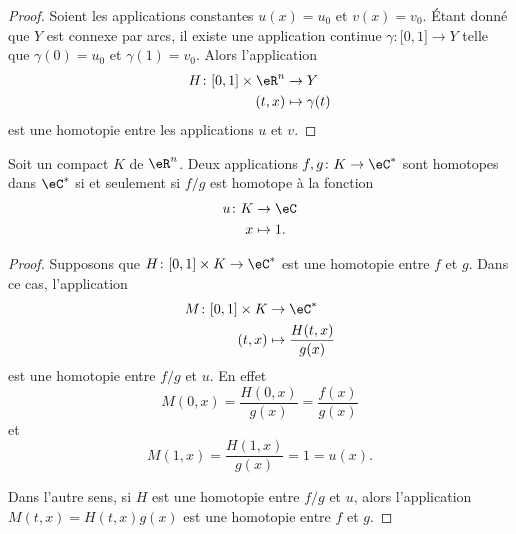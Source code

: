 \begin{proof}
    Soient les applications constantes \( u(x)=u_0\) et \( v(x)=v_0\). Étant donné que \( Y\) est connexe par arcs, il existe une application continue \( \gamma\colon \mathopen[ 0 , 1 \mathclose]\to Y\) telle que \( \gamma(0)=u_0\) et \( \gamma(1)=v_0\). Alors l'application
    \begin{equation}
        \begin{aligned}
            H\colon \mathopen[ 0 , 1 \mathclose]\times \eR^n&\to Y \\
            (t,x)&\mapsto \gamma(t) 
        \end{aligned}
    \end{equation}
    est une homotopie entre les applications \( u\) et \( v\).
\end{proof}

\begin{proposition}       \label{PROPooNABDooFtKukO}
    Soit un compact \( K\) de \( \eR^n\). Deux applications \( f,g\colon K\to \eC^*\) sont homotopes dans \( \eC^*\) si et seulement si \( f/g\) est homotope à la fonction 
    \begin{equation}
        \begin{aligned}
            u\colon K&\to \eC \\
            x&\mapsto 1. 
        \end{aligned}
    \end{equation}
\end{proposition}

\begin{proof}
    Supposons que \( H\colon \mathopen[ 0 , 1 \mathclose]\times K\to \eC^*\) est une homotopie entre \( f\) et \( g\). Dans ce cas, l'application
    \begin{equation}
        \begin{aligned}
            M\colon \mathopen[ 0 , 1 \mathclose]\times K&\to \eC^* \\
            (t,x)&\mapsto \frac{ H(t,x) }{ g(x) } 
        \end{aligned}
    \end{equation}
    est une homotopie entre \( f/g\) et \( u\). En effet
    \begin{equation}
        M(0,x)=\frac{ H(0,x) }{ g(x) }=\frac{ f(x) }{ g(x) }
    \end{equation}
    et
    \begin{equation}
        M(1,x)=\frac{ H(1,x) }{ g(x) }=1=u(x).
    \end{equation}

    Dans l'autre sens, si \( H\) est une homotopie entre \( f/g\) et \( u\), alors l'application \( M(t,x)=H(t,x)g(x)\) est une homotopie entre \( f\) et \( g\).
\end{proof}


